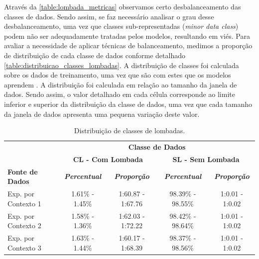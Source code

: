 Através da \autoref{table:lombada_metricas} observamos certo desbalanceamento das classes de dados. Sendo assim, se faz necessário analisar o grau desse desbalanceamento, uma vez que classes sub-representadas (\textit{minor data class}) podem não ser adequadamente tratadas pelos modelos, resultando em viés. Para avaliar a necessidade de aplicar técnicas de balanceamento, medimos a proporção de distribuição de cada classe de dados conforme detalhado \autoref{table:distribuicao_classes_lombadas}. A distribuição de classes foi calculada sobre os dados de treinamento, uma vez que são com estes que os modelos aprendem \cite{He2013, Kuhn2013}. A distribuição foi calculada em relação ao tamanho da janela de dados. Sendo assim, o valor detalhado em cada célula corresponde ao limite inferior e superior da distribuição da classe de dados, uma vez que cada tamanho da janela de dados apresenta uma pequena variação deste valor.

\begin{table}[h]
\caption{Distribuição de classes de lombadas.}
\label{table:distribuicao_classes_lombadas}
\centering
\scriptsize
\begin{tabular}{lcccc}
\cmidrule(l){2-5}
\multicolumn{1}{c}{\multirow{2}{*}{\textbf{}}} & 
\multicolumn{4}{c}{\textbf{Classe de Dados}} \\ \cmidrule(l){2-5} 
\multicolumn{1}{c}{} & 
\multicolumn{2}{c}{\textbf{CL - Com Lombada}} & 
\multicolumn{2}{c}{\textbf{SL - Sem Lombada}} \\ \midrule
\textbf{Fonte de Dados} & 
\textit{\textbf{Percentual}} & 
\textit{\textbf{Proporção}} & 
\textit{\textbf{Percentual}} & 
\textit{\textbf{Proporção}} \\ \midrule
Exp. por Contexto 1 & 1.61\% - 1.45\% & 1:60.87 - 1:67.76 & 98.39\% - 98.55\% & 1:0.01 - 1:0.02 \\ \midrule
Exp. por Contexto 2 & 1.58\% - 1.36\% & 1:62.03 - 1:72.22 & 98.42\% - 98.64\% & 1:0.01 - 1:0.02 \\ \midrule
Exp. por Contexto 3 & 1.63\% - 1.44\% & 1:60.17 - 1:68.39 & 98.37\% - 98.56\% & 1:0.01 - 1:0.02 \\ \bottomrule
\end{tabular}
\end{table}

